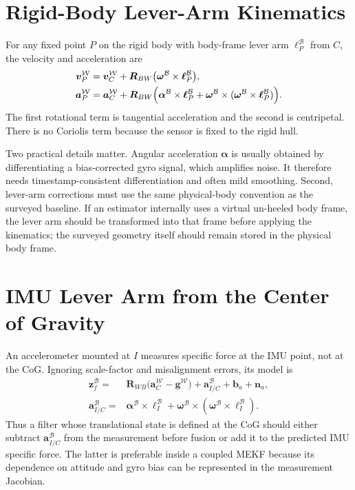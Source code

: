 \documentclass[conference]{IEEEtran}
\DeclareRobustCommand{\vct}[1]{\bm{#1}}
\DeclareRobustCommand{\mat}[1]{\bm{#1}}
\begin{document}
\section{Rigid-Body Lever-Arm Kinematics}
\label{sec:rigid-body}

For any fixed point $P$ on the rigid body with body-frame lever arm
$\vct\ell_P^{\mathcal B}$ from $C$, the velocity and acceleration are
\begin{align}
\vct v_P^{\mathcal W}
&=\vct v_C^{\mathcal W}
 +\mat R_{BW}\bigl(\vct\omega^{\mathcal B}\times
 \vct\ell_P^{\mathcal B}\bigr),
\label{eq:lever-velocity}\\
\vct a_P^{\mathcal W}
&=\vct a_C^{\mathcal W}
 +\mat R_{BW}\Bigl(
 \vct\alpha^{\mathcal B}\times\vct\ell_P^{\mathcal B}
 +\vct\omega^{\mathcal B}\times
  (\vct\omega^{\mathcal B}\times\vct\ell_P^{\mathcal B})
 \Bigr).
\label{eq:lever-acceleration}
\end{align}
The first rotational term is tangential acceleration and the second is centripetal.
There is no Coriolis term because the sensor is fixed to the rigid hull.

Two practical details matter.  Angular acceleration $\vct\alpha$ is usually obtained
by differentiating a bias-corrected gyro signal, which amplifies noise.  It therefore
needs timestamp-consistent differentiation and often mild smoothing.  Second,
lever-arm corrections must use the same physical-body convention as the surveyed
baseline.  If an estimator internally uses a virtual un-heeled body frame, the lever
arm should be transformed into that frame before applying the kinematics; the
surveyed geometry itself should remain stored in the physical body frame.

\section{IMU Lever Arm from the Center of Gravity}
\label{sec:imu-lever}

An accelerometer mounted at $I$ measures specific force at the IMU point, not at the
CoG.  Ignoring scale-factor and misalignment errors, its model is
\begin{align}
\vct z_f^{\mathcal B}
={}&\mat R_{WB}
\bigl(\vct a_C^{\mathcal W}-\vct g^{\mathcal W}\bigr)
+\vct a_{I/C}^{\mathcal B}
+\vct b_a+\vct n_a,
\label{eq:imu-specific-force}\\
\vct a_{I/C}^{\mathcal B}
={}&\vct\alpha^{\mathcal B}\times\vct\ell_I^{\mathcal B}
+\vct\omega^{\mathcal B}\times
 (\vct\omega^{\mathcal B}\times\vct\ell_I^{\mathcal B}).
\label{eq:imu-rot-acc}
\end{align}
Thus a filter whose translational state is defined at the CoG should either subtract
$\vct a_{I/C}^{\mathcal B}$ from the measurement before fusion or add it to the
predicted IMU specific force.  The latter is preferable inside a coupled MEKF because
its dependence on attitude and gyro bias can be represented in the measurement
Jacobian.
\end{document}
